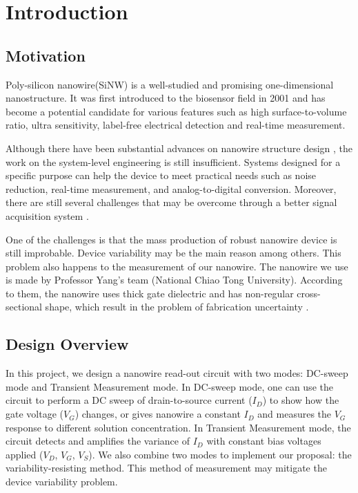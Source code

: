 \chapter{Introduction}
\section{Motivation}
Poly-silicon nanowire(SiNW) is a well-studied and promising one-dimensional nanostructure.
It was first introduced to the biosensor field in 2001\cite{C2001} and has become a potential candidate for various features such as high surface-to-volume ratio, ultra sensitivity, label-free electrical detection and real-time measurement.

Although there have been substantial advances on nanowire structure design \cite{R1}, the work on the system-level engineering is still insufficient.
Systems designed for a specific purpose can help the device to meet practical needs such as noise reduction, real-time measurement, and analog-to-digital conversion.
Moreover, there are still several challenges that may be overcome through a better signal acquisition system \cite{R1}.

One of the challenges is that the mass production of robust nanowire device is still improbable.
Device variability may be the main reason among others.
This problem also happens to the measurement of our nanowire.
The nanowire we use is made by Professor Yang's team (National Chiao Tong University).
According to them, the nanowire uses thick gate dielectric and has non-regular cross-sectional shape, which result in the problem of fabrication uncertainty \cite{C6}.


\section{Design Overview}
In this project, we design a nanowire read-out circuit with two modes: DC-sweep mode and Transient Measurement mode.
In DC-sweep mode, one can use the circuit to perform a DC sweep of drain-to-source current ($I_D$) to show how the gate voltage ($V_G$) changes, or gives nanowire a constant $I_D$ and measures the $V_{G}$ response to different solution concentration.
In Transient Measurement mode, the circuit detects and amplifies the variance of $I_D$ with constant bias voltages applied ($V_D$, $V_G$, $V_S$).
We also combine two modes to implement our proposal: the variability-resisting method.
This method of measurement may mitigate the device variability problem.


